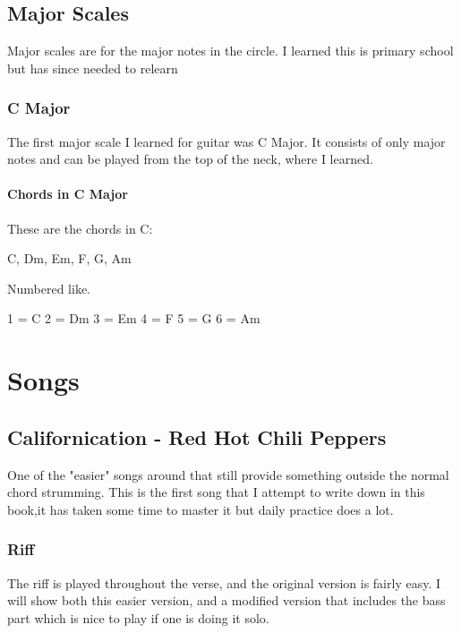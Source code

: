 \documentclass[11pt]{book}
\begin{document}
    \section{Major Scales}
    Major scales are for the major notes in the circle.
    I learned this is primary school but has since needed to relearn

    \subsection{C Major}
    The first major scale I learned for guitar was C Major.
    It consists of only major notes and can be played from the top of the neck, where I learned.

    \scales[
    name = C Major
    position = 1,
    finger = {
    1/1:1,3/1:3,
    1/2:1,3/2:3,
    2/3:2,
    2/4:2,3/4:3,
    2/5:2,3/5:3,
    1/6:2,3/6:3
    }
    ]

    \subsubsection{Chords in C Major}
    These are the chords in C:

    C, Dm, Em, F, G, Am

    Numbered like.

    1 = C
    2 = Dm
    3 = Em
    4 = F
    5 = G
    6 = Am


    \chapter{Songs}


    \section{Californication - Red Hot Chili Peppers}
    One of the "easier" songs around that still provide something outside the normal chord strumming.
    This is the first song that I attempt to write down in this book,it has taken some time to master it but daily practice does a lot.

    \subsection{Riff}
    The riff is played throughout the verse, and the original version is fairly easy.
    I will show both this easier version, and a modified version that includes the bass part which is nice to play if one is doing it solo.
\end{document}
